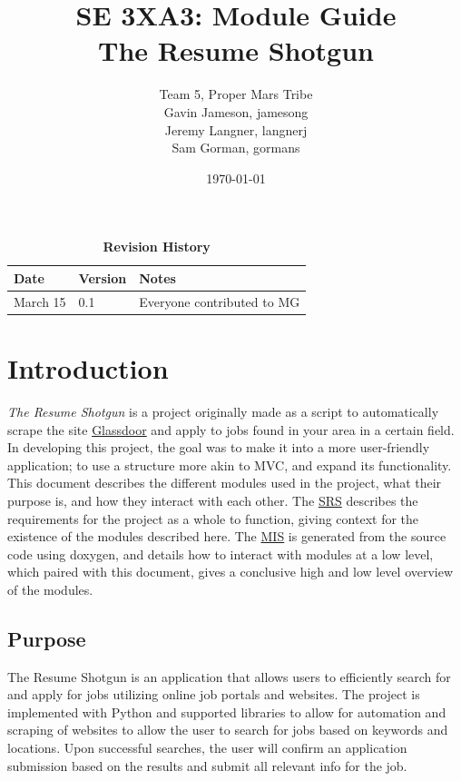 \documentclass[12pt, titlepage]{article}
\title{SE 3XA3: Module Guide\\The Resume Shotgun}
\author{Team 5, Proper Mars Tribe
		\\ Gavin Jameson, jamesong
		\\ Jeremy Langner, langnerj
		\\ Sam Gorman, gormans
}
\date{\today}
\begin{document}
\maketitle

\tableofcontents
\listoftables
\listoffigures

\begin{table}[H]
\caption{\bf Revision History}
\begin{tabularx}{\textwidth}{p{3cm}p{2cm}X}
\toprule {\bf Date} & {\bf Version} & {\bf Notes}\\
\midrule
March 15 & 0.1 & Everyone contributed to MG\\
\bottomrule
\end{tabularx}
\end{table}

\newpage


\section{Introduction}
\textit{The Resume Shotgun} is a project originally made as a script to automatically scrape the site \href{https://glassdoor.com}{Glassdoor} and apply to jobs found in your area in a certain field. In developing this project, the goal was to make it into a more user-friendly application; to use a structure more akin to MVC, and expand its functionality. This document describes the different modules used in the project, what their purpose is, and how they interact with each other. The \href{https://gitlab.cas.mcmaster.ca/jamesong/application_3xa3_l01_grp05/-/blob/main/Doc/SRS}{SRS} describes the requirements for the project as a whole to function, giving context for the existence of the modules described here. The \href{https://gitlab.cas.mcmaster.ca/jamesong/application_3xa3_l01_grp05/-/tree/main/Doc/Design/MIS}{MIS} is generated from the source code using doxygen, and details how to interact with modules at a low level, which paired with this document, gives a conclusive high and low level overview of the modules.

\subsection{Purpose} \label{purpose}
The Resume Shotgun is an application that allows users to efficiently search for and apply for jobs utilizing online job portals and websites. The project is implemented with Python and supported libraries to allow for automation and scraping of websites to allow the user to search for jobs based on keywords and locations. Upon successful searches, the user will confirm an application submission based on the results and submit all relevant info for the job.
\end{document}

